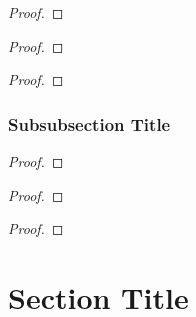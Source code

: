 \begin{proof}
    \lipsum[1]
\end{proof}

\begin{thrm}
    \lipsum[1]
\end{thrm}

\begin{proof}
    \lipsum[1]
\end{proof}

\begin{coro}
    \lipsum[1]
\end{coro}

\begin{proof}
    \lipsum[1]
\end{proof}

\subsubsection{Subsubsection Title}

\begin{lemm}
    \lipsum[1]
\end{lemm}

\begin{proof}
    \lipsum[1]
\end{proof}

\begin{thrm}
    \lipsum[1]
\end{thrm}

\begin{proof}
    \lipsum[1]
\end{proof}

\begin{coro}
    \lipsum[1]
\end{coro}

\begin{proof}
    \lipsum[1]
\end{proof}

\section{Section Title}

\lipsum[1]

\begin{defn}
    \lipsum[1]
\end{defn}

\begin{exmp}
    \lipsum[1]
\end{exmp}

